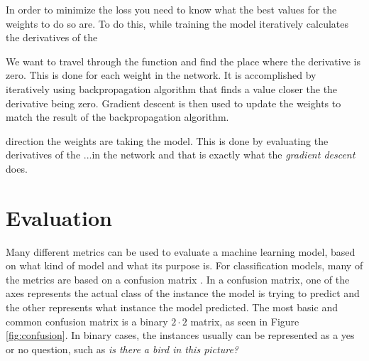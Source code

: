 \documentclass[nofilelist]{cslthse-msc}
\begin{document}
In order to minimize the loss you need to know what the best values for the weights to do so are. To do this, while training the model iteratively calculates the derivatives of the 

We want to travel through the function and find the place where the derivative is zero. This is done for each weight in the network. It is accomplished by iteratively using backpropagation algorithm that finds a value closer the the derivative being zero. Gradient descent is then used to update the weights to match the result of the backpropagation algorithm. 





direction the weights are taking the model. This is done by evaluating the derivatives of the ...in the network and that is exactly what the \textit{gradient descent} does.













\section{Evaluation}
Many different metrics can be used to evaluate a machine learning model, based on what kind of model and what its purpose is. For classification models, many of the metrics are based on a confusion matrix \citep{FAWCETT2006861}. In a confusion matrix, one of the axes represents the actual class of the instance the model is trying to predict and the other represents what instance the model predicted. The most basic and common confusion matrix is a binary $2 \cdot 2$ matrix, as seen in Figure \ref{fig:confusion}. In binary cases, the instances usually can be represented as a yes or no question, such as \textit{is there a bird in this picture?}
\end{document}
